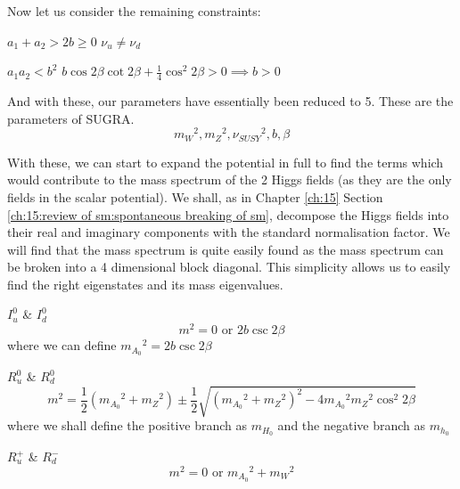 Now let us consider the remaining constraints:
\begin{important}{$a_1 + a_2 > 2b \geq 0$}
    $\nu_u \neq \nu_d$
\end{important}

\begin{important}{$a_1 a_2 < b^2$}
    $b \cos 2 \beta \cot 2 \beta + \frac{1}{4} \cos^2 2 \beta > 0 \implies b > 0$
\end{important}

And with these, our parameters have essentially been reduced to 5. These are the parameters of SUGRA.
\begin{equation}
    {m_W}^2, {m_Z}^2, {\nu_{SUSY}}^2, b, \beta
\end{equation}

With these, we can start to expand the potential in full to find the terms which would contribute to the mass spectrum of the 2 Higgs fields (as they are the only fields in the scalar potential). We shall, as in Chapter \ref{ch:15} Section \ref{ch:15:review of sm:spontaneous breaking of sm}, decompose the Higgs fields into their real and imaginary components with the standard normalisation factor. We will find that the mass spectrum is quite easily found as the mass spectrum can be broken into a 4 dimensional block diagonal. This simplicity allows us to easily find the right eigenstates and its mass eigenvalues.

\begin{important}{$I^0_u$ \& $I^0_d$}
    \begin{equation}
        m^2 = 0 \text{ or } 2b\csc 2\beta
    \end{equation} 
    where we can define ${m_{A_0}}^2 = 2b\csc 2\beta$ 
\end{important}

\begin{important}{$R^0_u$ \& $R^0_d$}
    \begin{equation}
        m^2 = \frac{1}{2}({m_{A_0}}^2 + {m_Z}^2) \pm \frac{1}{2} \sqrt{({m_{A_0}}^2 + {m_Z}^2)^2 - 4 {m_{A_0}}^2 {m_Z}^2 \cos^2 2 \beta}
    \end{equation}
    where we shall define the positive branch as $m_{H_0}$ and the negative branch as $m_{h_0}$
\end{important}

\begin{important}{$R^+_u$ \& $R^-_d$}
    \begin{equation}
        m^2 = 0 \text{ or } {m_{A_0}}^2 + {m_W}^2
    \end{equation}
\end{important}

